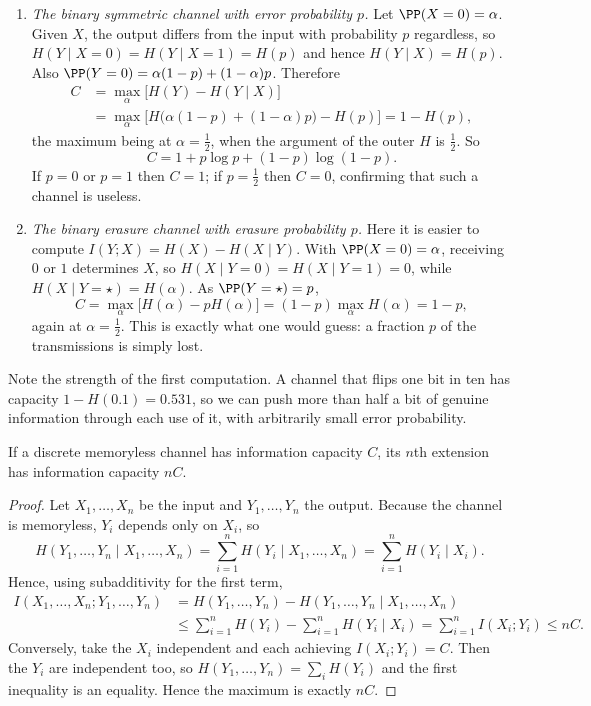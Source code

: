 \begin{example}\label{ex:capacities}
	\begin{enumerate}[label=(\roman*)]
		\item \emph{The binary symmetric channel with error probability $p$.} Let $\PP(X=0)=\alpha$. Given $X$, the output differs from the input with probability $p$ regardless, so $H(Y\mid X=0)=H(Y\mid X=1)=H(p)$ and hence $H(Y\mid X) = H(p)$. Also $\PP(Y=0) = \alpha(1-p)+(1-\alpha)p$. Therefore
		\begin{align*}
			C &= \max_\alpha\bigl[H(Y)-H(Y\mid X)\bigr]\\
			&= \max_\alpha \bigl[H\bigl(\alpha(1-p)+(1-\alpha)p\bigr)-H(p)\bigr] = 1-H(p),
		\end{align*}
		the maximum being at $\alpha = \tfrac12$, when the argument of the outer $H$ is $\tfrac12$. So
		$$C = 1 + p\log p + (1-p)\log(1-p).$$
		If $p = 0$ or $p=1$ then $C=1$; if $p = \tfrac12$ then $C = 0$, confirming that such a channel is useless.
		\item \emph{The binary erasure channel with erasure probability $p$.} Here it is easier to compute $I(Y;X) = H(X)-H(X\mid Y)$. With $\PP(X=0)=\alpha$, receiving $0$ or $1$ determines $X$, so $H(X\mid Y=0)=H(X\mid Y=1)=0$, while $H(X\mid Y=\star) = H(\alpha)$. As $\PP(Y=\star)=p$,
		$$C = \max_\alpha\bigl[H(\alpha)-pH(\alpha)\bigr] = (1-p)\max_\alpha H(\alpha) = 1-p,$$
		again at $\alpha=\tfrac12$. This is exactly what one would guess: a fraction $p$ of the transmissions is simply lost.
	\end{enumerate}
\end{example}

Note the strength of the first computation. A channel that flips one bit in ten has capacity $1-H(0.1) = 0.531$, so we can push more than half a bit of genuine information through each use of it, with arbitrarily small error probability.

\begin{lemma}\label{lem:extcap}
	If a discrete memoryless channel has information capacity $C$, its $n$th extension has information capacity $nC$.
\end{lemma}

\begin{proof}
	Let $X_1,\dots,X_n$ be the input and $Y_1,\dots,Y_n$ the output. Because the channel is memoryless, $Y_i$ depends only on $X_i$, so
	$$H(Y_1,\dots,Y_n\mid X_1,\dots,X_n) = \sum_{i=1}^n H(Y_i\mid X_1,\dots,X_n) = \sum_{i=1}^n H(Y_i\mid X_i).$$
	Hence, using subadditivity for the first term,
	\begin{align*}
		I(X_1,\dots,X_n;Y_1,\dots,Y_n) &= H(Y_1,\dots,Y_n)-H(Y_1,\dots,Y_n\mid X_1,\dots,X_n)\\
		&\le \sum_{i=1}^n H(Y_i)-\sum_{i=1}^n H(Y_i\mid X_i) = \sum_{i=1}^n I(X_i;Y_i) \le nC.
	\end{align*}
	Conversely, take the $X_i$ independent and each achieving $I(X_i;Y_i)=C$. Then the $Y_i$ are independent too, so $H(Y_1,\dots,Y_n) = \sum_i H(Y_i)$ and the first inequality is an equality. Hence the maximum is exactly $nC$.
\end{proof}

